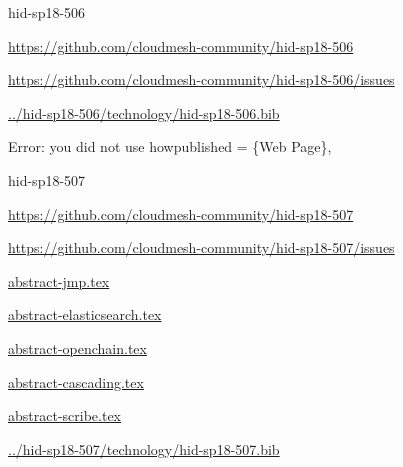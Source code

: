 \begin{IU}

hid-sp18-506

\url{https://github.com/cloudmesh-community/hid-sp18-506}

\url{https://github.com/cloudmesh-community/hid-sp18-506/issues}

\href{https://github.com/cloudmesh-community/hid-sp18-506/blob/master//technology/hid-sp18-506.bib}{../hid-sp18-506/technology/hid-sp18-506.bib}

Error: you did not use howpublished = \{Web Page\},

\end{IU}


\begin{IU}

hid-sp18-507

\url{https://github.com/cloudmesh-community/hid-sp18-507}

\url{https://github.com/cloudmesh-community/hid-sp18-507/issues}

\href{https://github.com/cloudmesh-community/hid-sp18-507/blob/master//technology/abstract-jmp.tex}{abstract-jmp.tex}

\href{https://github.com/cloudmesh-community/hid-sp18-507/blob/master//technology/abstract-elasticsearch.tex}{abstract-elasticsearch.tex}

\href{https://github.com/cloudmesh-community/hid-sp18-507/blob/master//technology/abstract-openchain.tex}{abstract-openchain.tex}

\href{https://github.com/cloudmesh-community/hid-sp18-507/blob/master//technology/abstract-cascading.tex}{abstract-cascading.tex}

\href{https://github.com/cloudmesh-community/hid-sp18-507/blob/master//technology/abstract-scribe.tex}{abstract-scribe.tex}

\href{https://github.com/cloudmesh-community/hid-sp18-507/blob/master//technology/hid-sp18-507.bib}{../hid-sp18-507/technology/hid-sp18-507.bib}

\end{IU}


